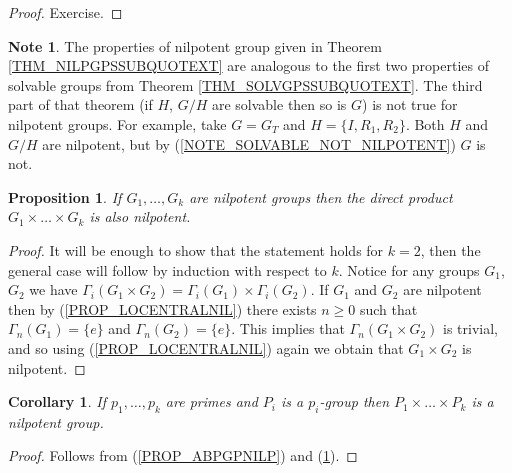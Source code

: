 \documentclass[12pt, letterpaper, oneside]{article}
\theoremstyle{plain}
\newtheorem{proposition}[theorem]{Proposition}
\newtheorem{corollary}[theorem]{Corollary}
\theoremstyle{definition}
\newtheorem{note}[theorem]{Note}
\newcommand{\vs}{\vskip 5mm}
\begin{document}
\vs

\begin{proof}
Exercise. 
\end{proof}


\vs\vs

\begin{note}
The properties of nilpotent group given  in Theorem \ref{THM_NILPGPSSUBQUOTEXT} are analogous to the first two properties of solvable groups from Theorem \ref{THM_SOLVGPSSUBQUOTEXT}. 
The third part of that theorem (if $H$, $G/H$ are solvable then so is $G$) is not true for nilpotent groups. 
For example, take $G = G_{T}$ and $H = \{I, R_{1}, R_{2}\}$. Both $H$ and $G/H$ are nilpotent, but by (\ref{NOTE_SOLVABLE_NOT_NILPOTENT}) $G$ is not. 
\end{note}

\vs\vs

\begin{proposition}
\label{COR_PRODNILP}
If $G_{1}, \dots,  G_{k}$ are nilpotent groups then the direct product $G_{1}\times \dots \times G_{k}$
is also nilpotent.
\end{proposition}


\vs

\begin{proof}
It will be  enough to show that the statement holds for $k=2$, then the general case will follow by induction  
with respect to $k$. Notice for any groups  $G_{1}$, $G_{2}$ we have
$\Gamma_{i}(G_{1}\times G_{2}) = \Gamma_{i}(G_{1})\times \Gamma_{i}(G_{2})$. If $G_{1}$ and 
$G_{2}$ are nilpotent then by (\ref{PROP_LOCENTRALNIL}) there exists $n \geq 0$ such that 
$\Gamma_{n}(G_{1}) = \{e\}$ and $\Gamma_{n}(G_{2}) = \{e\}$. This implies that  
$\Gamma_{n}(G_{1}\times G_{2})$ is trivial, and so using  (\ref{PROP_LOCENTRALNIL}) again 
we obtain that $G_{1}\times G_{2}$ is nilpotent. 
  
\end{proof}


\vs\vs


\begin{corollary}
\label{COR_PRODPGPSISNILP}
If $p_{1}, \dots, p_{k}$ are primes and $P_{i}$ is a $p_{i}$-group then  $P_{1}\times {\dots} \times P_{k}$
is a nilpotent group. 
\end{corollary}

\vs 

\begin{proof}
Follows from (\ref{PROP_ABPGPNILP}) and (\ref{COR_PRODNILP}).
\end{proof}
\end{document}
